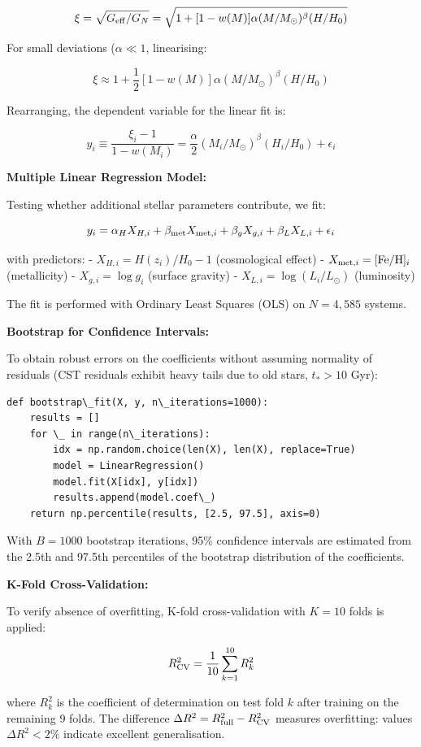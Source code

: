 \documentclass[10pt,a4paper]{article}
\begin{document}
\[\xi = \sqrt{G_{\rm eff}/G_N} = \sqrt{1 + [1-w(M)]\alpha(M/M_\odot)^\beta (H/H_0)}\]

For small deviations (\(\alpha \ll 1\), linearising:

\[\xi \approx 1 + \frac{1}{2}[1-w(M)]\alpha(M/M_\odot)^\beta (H/H_0)\]

Rearranging, the dependent variable for the linear fit is:

\[y_i \equiv \frac{\xi_i - 1}{1-w(M_i)} = \frac{\alpha}{2}(M_i/M_\odot)^\beta (H_i/H_0) + \epsilon_i\]

\textbf{Multiple Linear Regression Model:}

Testing whether additional stellar parameters contribute, we fit:

\[y_i = \alpha_H X_{H,i} + \beta_{\rm met} X_{{\rm met},i} + \beta_g X_{g,i} + \beta_L X_{L,i} + \epsilon_i\]

with predictors: - \(X_{H,i} = H(z_i)/H_0 - 1\) (cosmological effect) -
\(X_{{\rm met},i} = [{\rm Fe/H}]_i\) (metallicity) -
\(X_{g,i} = \log g_i\) (surface gravity) -
\(X_{L,i} = \log(L_i/L_\odot)\) (luminosity)

The fit is performed with Ordinary Least Squares (OLS) on \(N = 4,585\)
systems.

\textbf{Bootstrap for Confidence Intervals:}

To obtain robust errors on the coefficients without assuming normality
of residuals (CST residuals exhibit heavy tails due to old stars,
\(t_* > 10\) Gyr):

\begin{lstlisting}
def bootstrap\_fit(X, y, n\_iterations=1000):
    results = []
    for \_ in range(n\_iterations):
        idx = np.random.choice(len(X), len(X), replace=True)
        model = LinearRegression()
        model.fit(X[idx], y[idx])
        results.append(model.coef\_)
    return np.percentile(results, [2.5, 97.5], axis=0)
\end{lstlisting}

With \(B = 1000\) bootstrap iterations, 95\% confidence intervals are
estimated from the 2.5th and 97.5th percentiles of the bootstrap
distribution of the coefficients.

\textbf{K-Fold Cross-Validation:}

To verify absence of overfitting, K-fold cross-validation with
\(K = 10\) folds is applied:

\[R^2_{\rm CV} = \frac{1}{10}\sum_{k=1}^{10} R^2_k\]

where \(R^2_k\) is the coefficient of determination on test fold \(k\)
after training on the remaining 9 folds. The difference
\(\Delta R^2 = R^2_{\rm full} - R^2_{\rm CV}\) measures overfitting:
values \(\Delta R^2 < 2\%\) indicate excellent generalisation.
\end{document}
